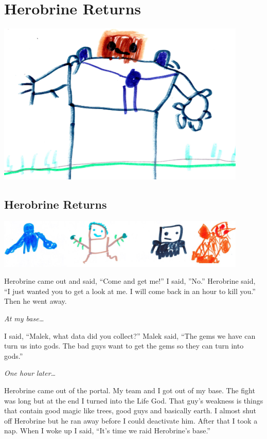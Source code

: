 \documentclass[booklet, twoside, 12pt]{krantz}
\begin{document}
\hypertarget{herobrine-returns}{%
\chapter{Herobrine Returns}\label{herobrine-returns}}

\includegraphics[width=4.6875in,height=\textheight]{img/herobrine-returns/1-herobrine-medium.jpg}

\clearpage

\hypertarget{herobrine-returns-1}{%
\section{Herobrine Returns}\label{herobrine-returns-1}}

\includegraphics[width=4.6875in,height=\textheight]{img/herobrine-returns/3-gods.jpg}

Herobrine came out and said, ``Come and get me!'' I said, ''No.''
Herobrine said, ``I just wanted you to get a look at me. I will come
back in an hour to kill you.'' Then he went away.

\emph{At my base\ldots{}}

I said, ``Malek, what data did you collect?'' Malek said, ``The gems we
have can turn us into gods. The bad guys want to get the gems so they
can turn into gods.''

\emph{One hour later\ldots{}}

Herobrine came out of the portal. My team and I got out of my base. The
fight was long but at the end I turned into the Life God. That guy's
weakness is things that contain good magic like trees, good guys and
basically earth. I almost shut off Herobrine but he ran away before I
could deactivate him. After that I took a nap. When I woke up I said,
``It's time we raid Herobrine's base.''
\end{document}
